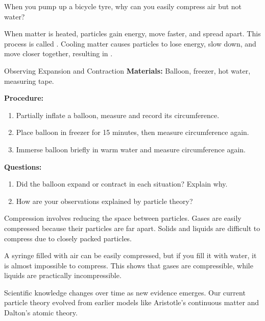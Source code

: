 \begin{stopandthink}
When you pump up a bicycle tyre, why can you easily compress air but not water?
\end{stopandthink}

\FloatBarrier

When matter is heated, particles gain energy, move faster, and spread apart. This process is called . Cooling matter causes particles to lose energy, slow down, and move closer together, resulting in .

\begin{investigation}{Observing Expansion and Contraction}
\textbf{Materials:} Balloon, freezer, hot water, measuring tape.

\textbf{Procedure:}
\begin{enumerate}
    \item Partially inflate a balloon, measure and record its circumference.
    \item Place balloon in freezer for 15 minutes, then measure circumference again.
    \item Immerse balloon briefly in warm water and measure circumference again.
\end{enumerate}

\textbf{Questions:}
\begin{enumerate}
    \item Did the balloon expand or contract in each situation? Explain why.
    \item How are your observations explained by particle theory?
\end{enumerate}
\end{investigation}

\FloatBarrier

Compression involves reducing the space between particles. Gases are easily compressed because their particles are far apart. Solids and liquids are difficult to compress due to closely packed particles.

\begin{example}
A syringe filled with air can be easily compressed, but if you fill it with water, it is almost impossible to compress. This shows that gases are compressible, while liquids are practically incompressible.
\end{example}

\FloatBarrier

Scientific knowledge changes over time as new evidence emerges. Our current particle theory evolved from earlier models like Aristotle’s continuous matter and Dalton’s atomic theory.

